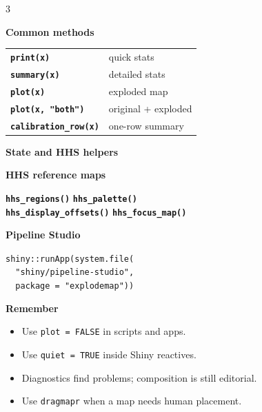 \documentclass[9pt,landscape]{article}
\newcommand{\fn}[1]{\texttt{\footnotesize\bfseries\color{primary}#1}}
\newcommand{\code}[1]{\texttt{\footnotesize\color{ink}#1}}
\newcommand{\sectionbox}[1]{%
  \vspace{4pt}
  \colorbox{soft}{\parbox{\dimexpr\columnwidth-2\fboxsep}{\small\bfseries\color{primary}#1}}
  \vspace{2pt}
}
\newcommand{\minihead}[1]{{\footnotesize\bfseries\color{ink}#1}\par}
\begin{document}
\begin{multicols}{3}
\sectionbox{Common methods}
\begin{tabular}{@{}ll@{}}
\fn{print(x)} & {\footnotesize quick stats} \\
\fn{summary(x)} & {\footnotesize detailed stats} \\
\fn{plot(x)} & {\footnotesize exploded map} \\
\fn{plot(x, "both")} & {\footnotesize original + exploded} \\
\fn{calibration\_row(x)} & {\footnotesize one-row summary} \\
\end{tabular}

\sectionbox{State and HHS helpers}
\minihead{HHS reference maps}
\fn{hhs\_regions()} \quad
\fn{hhs\_palette()}\\
\fn{hhs\_display\_offsets()} \quad
\fn{hhs\_focus\_map()}

\minihead{Pipeline Studio}
\code{shiny::runApp(system.file(}\\
\code{\ \ "shiny/pipeline-studio",}\\
\code{\ \ package = "explodemap"))}

\sectionbox{Remember}
\begin{itemize}[leftmargin=*,nosep]
\item {\footnotesize Use \code{plot = FALSE} in scripts and apps.}
\item {\footnotesize Use \code{quiet = TRUE} inside Shiny reactives.}
\item {\footnotesize Diagnostics find problems; composition is still editorial.}
\item {\footnotesize Use \code{dragmapr} when a map needs human placement.}
\end{itemize}

\end{multicols}
\end{document}
